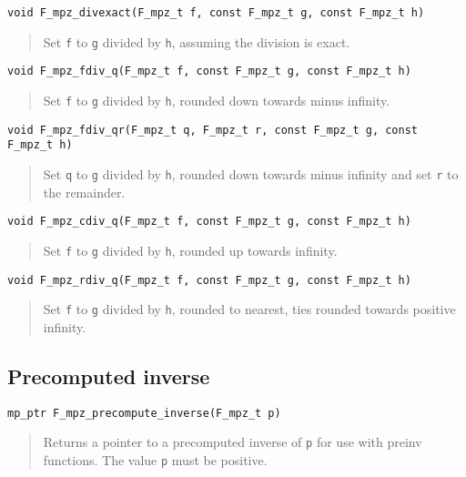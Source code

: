 \documentclass[a4paper,10pt]{article}
\newcommand{\code}{\lstinline}
\begin{document}
\begin{lstlisting}
void F_mpz_divexact(F_mpz_t f, const F_mpz_t g, const F_mpz_t h)
\end{lstlisting}
\begin{quote}
Set \code{f} to \code{g} divided by \code{h}, assuming the division is exact.
\end{quote}

\begin{lstlisting}
void F_mpz_fdiv_q(F_mpz_t f, const F_mpz_t g, const F_mpz_t h)
\end{lstlisting}
\begin{quote}
Set \code{f} to \code{g} divided by \code{h}, rounded down towards minus infinity.
\end{quote}

\begin{lstlisting}
void F_mpz_fdiv_qr(F_mpz_t q, F_mpz_t r, const F_mpz_t g, const F_mpz_t h)
\end{lstlisting}
\begin{quote}
Set \code{q} to \code{g} divided by \code{h}, rounded down towards minus infinity and set \code{r} to the remainder.
\end{quote}

\begin{lstlisting}
void F_mpz_cdiv_q(F_mpz_t f, const F_mpz_t g, const F_mpz_t h)
\end{lstlisting}
\begin{quote}
Set \code{f} to \code{g} divided by \code{h}, rounded up towards infinity.
\end{quote}

\begin{lstlisting}
void F_mpz_rdiv_q(F_mpz_t f, const F_mpz_t g, const F_mpz_t h)
\end{lstlisting}
\begin{quote}
Set \code{f} to \code{g} divided by \code{h}, rounded to nearest, ties rounded towards positive infinity.
\end{quote}

\subsection{Precomputed inverse}

\begin{lstlisting}
mp_ptr F_mpz_precompute_inverse(F_mpz_t p)
\end{lstlisting}
\begin{quote}
Returns a pointer to a precomputed inverse of \code{p} for use with preinv functions. The value \code{p} must be positive.
\end{quote}
\end{document}
